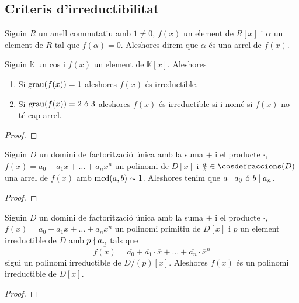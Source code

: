 \documentclass[../Apunts.tex]{subfiles}
\begin{document}
	\subsection{Criteris d'irreductibilitat}
	\begin{definition}[Arrel]
		\label{def:arrel d'un polinomi}
		Siguin \(R\) un anell commutatiu amb \(1\neq0\), \(f(x)\) un element de \(R[x]\) i \(\alpha\) un element de \(R\) tal que \(f(\alpha)=0\). Aleshores direm que \(\alpha\) és una arrel de \(f(x)\).
	\end{definition}
	\begin{proposition}
		Siguin \(\mathbb{K}\) un cos i \(f(x)\) un element de \(\mathbb{K}[x]\). Aleshores
		\begin{enumerate}
			\item Si \(\operatorname{grau}(f(x))=1\) aleshores \(f(x)\) és irreductible.
			\item Si \(\operatorname{grau}(f(x))=2\text{ ó }3\) aleshores \(f(x)\) és irreductible si i nomé si \(f(x)\) no té cap arrel.
		\end{enumerate}
		\begin{proof}
		\end{proof}
	\end{proposition}
	\begin{proposition}
		Siguin \(D\) un domini de factorització única amb la suma \(+\) i el producte \(\cdot\), \(f(x)=a_{0}+a_{1}x+\dots+a_{n}x^{n}\) un polinomi de \(D[x]\) i \(\frac{a}{b}\in\cosdefraccions(D)\) una arrel de \(f(x)\) amb \(\operatorname{mcd}(a,b)\sim1\). Aleshores tenim que \(a\mathrel{|} a_{0}\) ó \(b\mathrel{|} a_{n}\).
		\begin{proof}
		\end{proof}
	\end{proposition}
	\begin{theorem}
		\label{thm:Criteri modular}
		Siguin \(D\) un domini de factorització única amb la suma \(+\) i el producte \(\cdot\), \(f(x)=a_{0}+a_{1}x+\dots+a_{n}x^{n}\) un polinomi primitiu de \(D[x]\) i \(p\) un element irreductible de \(D\) amb \(p\mathrel{\nmid} a_{n}\) tals que
		\[\overline{f(x)}=\overline{a_{0}}+\overline{a_{1}}\cdot\overline{x}+\dots+\overline{a_{n}}\cdot\overline{x}^{n}\]
		sigui un polinomi irreductible de \(D/(p)[x]\). Aleshores \(f(x)\) és un polinomi irreductible de \(D[x]\).
		\begin{proof}
		\end{proof}
	\end{theorem}
\end{document}

